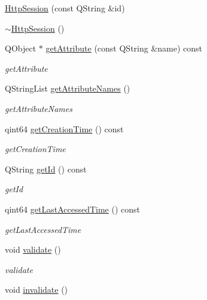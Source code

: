 \begin{DoxyCompactItemize}
\item 
\hyperlink{class_c_w_f_1_1_http_session_ada538681cbb10e52155e1bcf1a709cf8}{Http\+Session} (const Q\+String \&id)
\item 
\hyperlink{class_c_w_f_1_1_http_session_a4bd78eaae88a81643a9e3a911c21759a}{$\sim$\+Http\+Session} ()
\item 
Q\+Object $\ast$ \hyperlink{class_c_w_f_1_1_http_session_a44f59df340395d9c298c93ee5307b392}{get\+Attribute} (const Q\+String \&name) const 
\begin{DoxyCompactList}\small\item\em get\+Attribute \end{DoxyCompactList}\item 
Q\+String\+List \hyperlink{class_c_w_f_1_1_http_session_a4f7d235f4e4355b6f87179931ced7506}{get\+Attribute\+Names} ()
\begin{DoxyCompactList}\small\item\em get\+Attribute\+Names \end{DoxyCompactList}\item 
qint64 \hyperlink{class_c_w_f_1_1_http_session_afbb49e2fe7c7f1eb7ea25ec2da21c3dd}{get\+Creation\+Time} () const 
\begin{DoxyCompactList}\small\item\em get\+Creation\+Time \end{DoxyCompactList}\item 
Q\+String \hyperlink{class_c_w_f_1_1_http_session_a78aebc496a395e40ab3187e14f4240ed}{get\+Id} () const 
\begin{DoxyCompactList}\small\item\em get\+Id \end{DoxyCompactList}\item 
qint64 \hyperlink{class_c_w_f_1_1_http_session_aa746de987d9c96c1d47005f8135f0aa2}{get\+Last\+Accessed\+Time} () const 
\begin{DoxyCompactList}\small\item\em get\+Last\+Accessed\+Time \end{DoxyCompactList}\item 
void \hyperlink{class_c_w_f_1_1_http_session_a9702d3c0b959cb59aac53d9eb9a05fd7}{validate} ()
\begin{DoxyCompactList}\small\item\em validate \end{DoxyCompactList}\item 
void \hyperlink{class_c_w_f_1_1_http_session_ab8995bcc1581f0116ff73e0496ca8a12}{invalidate} ()

\end{DoxyCompactItemize}
